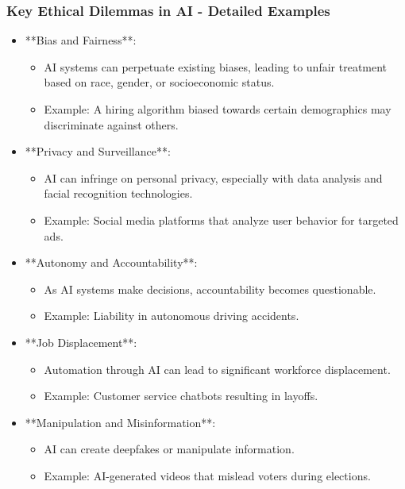 \documentclass[aspectratio=169]{beamer}
\begin{document}
\begin{frame}[fragile]
    \frametitle{Key Ethical Dilemmas in AI - Detailed Examples}
    \begin{itemize}
        \item **Bias and Fairness**:
            \begin{itemize}
                \item AI systems can perpetuate existing biases, leading to unfair treatment based on race, gender, or socioeconomic status.
                \item Example: A hiring algorithm biased towards certain demographics may discriminate against others.
            \end{itemize}
        
        \item **Privacy and Surveillance**:
            \begin{itemize}
                \item AI can infringe on personal privacy, especially with data analysis and facial recognition technologies.
                \item Example: Social media platforms that analyze user behavior for targeted ads.
            \end{itemize}
        
        \item **Autonomy and Accountability**:
            \begin{itemize}
                \item As AI systems make decisions, accountability becomes questionable.
                \item Example: Liability in autonomous driving accidents.
            \end{itemize}
        
        \item **Job Displacement**:
            \begin{itemize}
                \item Automation through AI can lead to significant workforce displacement.
                \item Example: Customer service chatbots resulting in layoffs.
            \end{itemize}
        
        \item **Manipulation and Misinformation**:
            \begin{itemize}
                \item AI can create deepfakes or manipulate information.
                \item Example: AI-generated videos that mislead voters during elections.
            \end{itemize}
    \end{itemize}
\end{frame}
\end{document}
